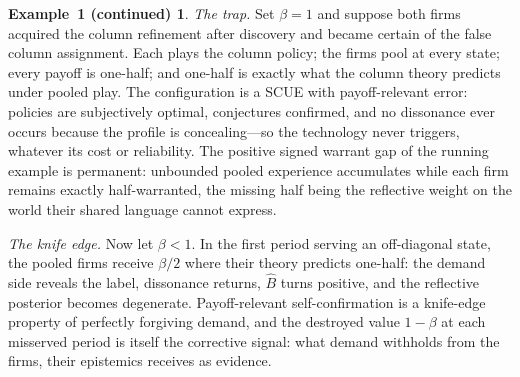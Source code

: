 \documentclass[11pt]{article}
\theoremstyle{definition}
\newtheorem*{excont}{Example~1 (continued)}
\begin{document}
\begin{excont}
\emph{The trap.}
Set $\beta=1$ and suppose both firms acquired the column refinement after discovery and became certain of the false column assignment.
Each plays the column policy; the firms pool at every state; every payoff is one-half; and one-half is exactly what the column theory predicts under pooled play.
The configuration is a SCUE with payoff-relevant error: policies are subjectively optimal, conjectures confirmed, and no dissonance ever occurs because the profile is concealing---so the technology never triggers, whatever its cost or reliability.
The positive signed warrant gap of the running example is permanent: unbounded pooled experience accumulates while each firm remains exactly half-warranted, the missing half being the reflective weight on the world their shared language cannot express.

\emph{The knife edge.}
Now let $\beta<1$.
In the first period serving an off-diagonal state, the pooled firms receive $\beta/2$ where their theory predicts one-half: the demand side reveals the label, dissonance returns, $\widehat B$ turns positive, and the reflective posterior becomes degenerate.
Payoff-relevant self-confirmation is a knife-edge property of perfectly forgiving demand, and the destroyed value $1-\beta$ at each misserved period is itself the corrective signal: what demand withholds from the firms, their epistemics receives as evidence.


\end{excont}
\end{document}
